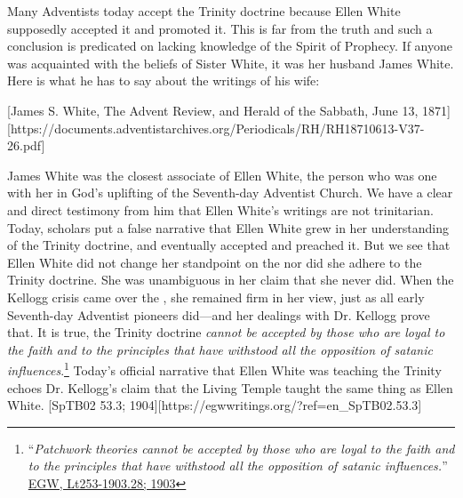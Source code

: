 Many Adventists today accept the Trinity doctrine because Ellen White supposedly accepted it and promoted it. This is far from the truth and such a conclusion is predicated on lacking knowledge of the Spirit of Prophecy. If anyone was acquainted with the beliefs of Sister White, it was her husband James White. Here is what he has to say about the writings of his wife:

[James S. White, The Advent Review, and Herald of the Sabbath, June 13, 1871][https://documents.adventistarchives.org/Periodicals/RH/RH18710613-V37-26.pdf]

James White was the closest associate of Ellen White, the person who was one with her in God’s uplifting of the Seventh-day Adventist Church. We have a clear and direct testimony from him that Ellen White’s writings are not trinitarian. Today, scholars put a false narrative that Ellen White grew in her understanding of the Trinity doctrine, and eventually accepted and preached it. But we see that Ellen White did not change her standpoint on the  nor did she adhere to the Trinity doctrine. She was unambiguous in her claim that she never did. When the Kellogg crisis came over the , she remained firm in her view, just as all early Seventh-day Adventist pioneers did—and her dealings with Dr. Kellogg prove that. It is true, the Trinity doctrine \textit{cannot be accepted by those who are loyal to the faith and to the principles that have withstood all the opposition of satanic influences}.\footnote{“\textit{Patchwork theories cannot be accepted by those who are loyal to the faith and to the principles that have withstood all the opposition of satanic influences.}” \href{https://egwwritings.org/?ref=en_Lt253-1903.28&para=9980.36}{{EGW, Lt253-1903.28; 1903}}} Today’s official narrative that Ellen White was teaching the Trinity echoes Dr. Kellogg’s claim that the Living Temple taught the same thing as Ellen White. [SpTB02 53.3; 1904][https://egwwritings.org/?ref=en\_SpTB02.53.3]